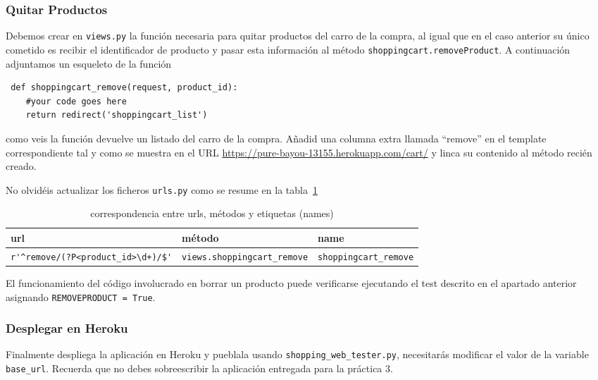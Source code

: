\documentclass[12pt]{article} %
\newcommand{\ttt}[1]{\texttt{#1}}%
\newcommand{\views}{\texttt{views.py}}%
\newcommand{\urls}{\texttt{urls.py}}%
\begin{document}
\subsubsection {Quitar Productos}

Debemos crear en \views{} la función necesaria para quitar productos del carro de la compra, al igual que en el caso anterior su único cometido es recibir el identificador de producto y  pasar esta información al método \ttt{shoppingcart.removeProduct}. A continuación adjuntamos un esqueleto de la función

\begin{lstlisting}
 def shoppingcart_remove(request, product_id):
    #your code goes here
    return redirect('shoppingcart_list')
\end{lstlisting}
como veis la función devuelve un listado del carro de la compra. Añadid una columna extra llamada ``remove'' en el template correspondiente tal y como se muestra en el URL \url{https://pure-bayou-13155.herokuapp.com/cart/} y linca su contenido al método recién creado.

No olvidéis actualizar los ficheros \urls{} como se resume en la tabla~\ref{tab:urlsshoppingremove}

\begin{table}[H]
\centering
\begin{tabular}{lll}
    \textbf{url} & \textbf{método} & \textbf{name} \\ \hline
 \verb|r'^remove/(?P<product_id>\d+)/$'|  & \verb|views.shoppingcart_remove|  & \verb|shoppingcart_remove|\\
\end{tabular}
\caption{correspondencia entre urls, métodos y etiquetas (names)}
\label{tab:urlsshoppingremove}
\end{table}

El funcionamiento del código involucrado en borrar un producto puede  verificarse ejecutando el test descrito en el apartado anterior asignando \ttt{REMOVEPRODUCT = True}.

\subsubsection {Desplegar en Heroku}

Finalmente despliega la  aplicación en Heroku y pueblala usando \ttt{shopping\_web\_tester.py}, necesitarás modificar el valor de la variable \ttt{base\_url}. Recuerda que no debes sobreescribir la aplicación entregada para la práctica 3.
\end{document}
